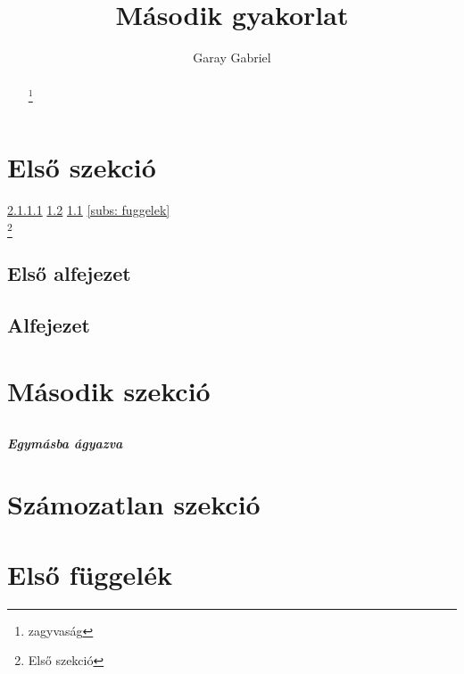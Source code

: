 \documentclass[twoside, 12pt]{article}
\title{Második gyakorlat}
\author{Garay Gabriel}
\begin{document}
\renewcommand{\thefootnote}{\fnsymbol{footnote}}
\begin{abstract}
\hulipsum[1-2]
\footnote{zagyvaság}
\end{abstract}


\newpage
\setcounter{tocdepth}{5}
\tableofcontents
{}
\clearpage

\section[Első]{Első szekció}
\ref{p:mely}
\ref{s:sectionvege}
\ref{ssec:substil}
\ref{subs: fuggelek}
\\
\pageref{s:sectionvege}
\pageref{p:mely}
\pageref{ssec:substil}
\pageref{subs: fuggelek}
\label{s:oldalstil}
\footnote{Első szekció}
\subsection{Első alfejezet}
\label{ssec:substil}
\hulipsum[1-2]
\newpage

\subsection{Alfejezet}
\label{s:sectionvege}
\hulipsum[3-4]

\newpage
\setcounter{secnumdepth}{5}
\section{Második szekció}
\subsection{}
\subsubsection{}
\paragraph{}
\label{p:mely}
\subparagraph{Egymásba ágyazva}

\clearpage
\section*{Számozatlan szekció}
\label{s:szamozatlan}
\hulipsum[1-6]
\appendix
\section{Első függelék}
\end{document}
